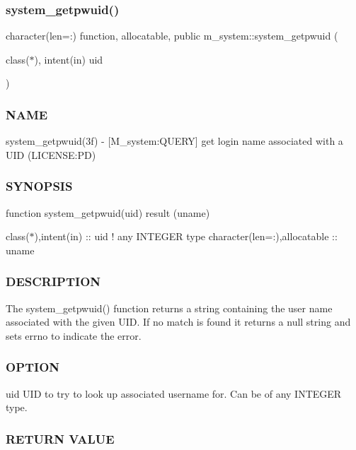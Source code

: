 \subsubsection{\texorpdfstring{system\+\_\+getpwuid()}{system\_getpwuid()}}
{\footnotesize\ttfamily character(len=\+:) function, allocatable, public m\+\_\+system\+::system\+\_\+getpwuid (\begin{DoxyParamCaption}\item[{class($\ast$), intent(in)}]{uid }\end{DoxyParamCaption})}



\subsubsection*{N\+A\+ME}

system\+\_\+getpwuid(3f) -\/ \mbox{[}M\+\_\+system\+:Q\+U\+E\+RY\mbox{]} get login name associated with a U\+ID (L\+I\+C\+E\+N\+SE\+:PD) \subsubsection*{S\+Y\+N\+O\+P\+S\+IS}

function system\+\_\+getpwuid(uid) result (uname)

class($\ast$),intent(in) \+:\+: uid ! any I\+N\+T\+E\+G\+ER type character(len=\+:),allocatable \+:\+: uname

\subsubsection*{D\+E\+S\+C\+R\+I\+P\+T\+I\+ON}

\begin{DoxyVerb}The system_getpwuid() function returns a string containing the user
name associated with the given UID. If no match is found it returns
a null string and sets errno to indicate the error.
\end{DoxyVerb}


\subsubsection*{O\+P\+T\+I\+ON}

uid U\+ID to try to look up associated username for. Can be of any I\+N\+T\+E\+G\+ER type.

\subsubsection*{R\+E\+T\+U\+RN V\+A\+L\+UE}

